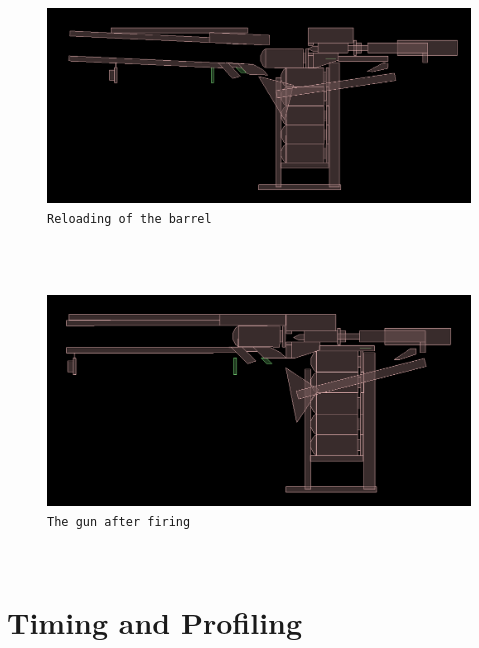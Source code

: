 \documentclass{article}
\begin{document}
\\
\\
\begin{figure}[hbtp]
\centering
\includegraphics[scale=0.3]{reload.png}
\caption{\texttt{Reloading of the barrel}}
\end{figure}
\\
\\
\begin{figure}[hbtp]
\centering
\includegraphics[scale=0.3]{after_firing.png}
\caption{\texttt{The gun after firing}}
\end{figure}
\\
\pagebreak
\pagebreak
\section{Timing and Profiling}
\end{document}
